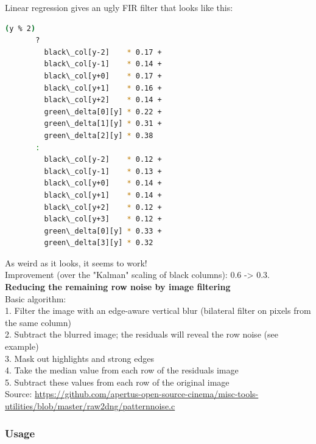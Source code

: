 {Linear regression gives an ugly FIR filter that looks like this: \\

\begin{lstlisting}[language=bash,morekeywords=$,keywordstyle=\bfseries,frame=none,xleftmargin=.25in,belowskip=2em, aboveskip=2em]
    (y % 2)
       ?
         black\_col[y-2]    * 0.17 +
         black\_col[y-1]    * 0.14 +
         black\_col[y+0]    * 0.17 +
         black\_col[y+1]    * 0.16 +
         black\_col[y+2]    * 0.14 +
         green\_delta[0][y] * 0.22 +
         green\_delta[1][y] * 0.31 +
         green\_delta[2][y] * 0.38
       :
         black\_col[y-2]    * 0.12 +
         black\_col[y-1]    * 0.13 +
         black\_col[y+0]    * 0.14 +
         black\_col[y+1]    * 0.14 +
         black\_col[y+2]    * 0.12 +
         black\_col[y+3]    * 0.12 +
         green\_delta[0][y] * 0.33 +
         green\_delta[3][y] * 0.32
\end{lstlisting}

As weird as it looks, it seems to work!\\

Improvement (over the "Kalman" scaling of black columns): 0.6 -> 0.3.\\ 



\textbf{Reducing the remaining row noise by image filtering}\\

Basic algorithm:\\

1. Filter the image with an edge-aware vertical blur (bilateral filter on pixels from the same column)\\
2. Subtract the blurred image; the residuals will reveal the row noise (see example)\\
3. Mask out highlights and strong edges\\
4. Take the median value from each row of the residuals image\\
5. Subtract these values from each row of the original image \\

Source: \href{https://github.com/apertus-open-source-cinema/misc-tools-utilities/blob/master/raw2dng/patternnoise.c}{https://github.com/apertus-open-source-cinema/misc-tools-utilities/blob/master/raw2dng/patternnoise.c} \\





\subsubsection{Usage}

}
